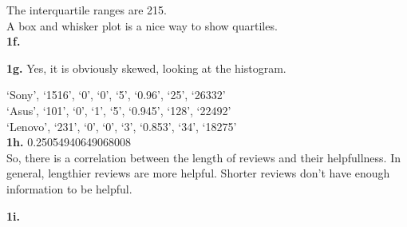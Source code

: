 \documentclass[10pt]{amsart}
\def\wl{\par \vspace{\baselineskip}}
\begin{document}
\wl

The interquartile ranges are 215. \\

A box and whisker plot is a nice way to show quartiles.\\

\textbf{1f.} \\


\textbf{1g.} Yes, it is obviously skewed, looking at the histogram.

`Sony', `1516', `0', `0', `5', `0.96', `25', `26332' \\
`Asus', `101', `0', `1', `5', `0.945', `128', `22492' \\
`Lenovo', `231', `0', `0', `3', `0.853', `34', `18275' \\

\textbf{1h.} 0.25054940649068008 \\

So, there is a correlation between the length of reviews and their helpfullness.
In general, lengthier reviews are more helpful. Shorter reviews don't have
enough information to be helpful. 

\textbf{1i.} \\

\end{document}
